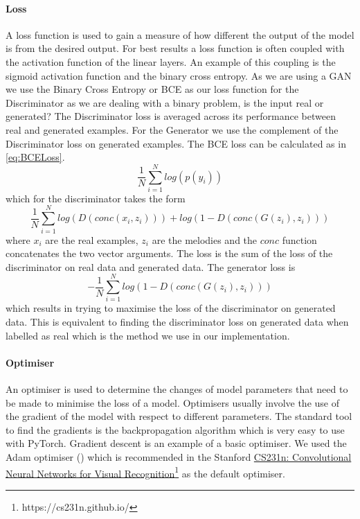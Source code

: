 \paragraph{Loss}
A loss function is used to gain a measure of how different the output of the model is from the desired output.
For best results a loss function is often coupled with the activation function of the linear layers.
An example of this coupling is the sigmoid activation function and the binary cross entropy. %
As we are using a GAN we use the Binary Cross Entropy or BCE as our loss function for the Discriminator as we are dealing with a binary problem, is the input real or generated?
The Discriminator loss is averaged across its performance between real and generated examples.
For the Generator we use the complement of the Discriminator loss on generated examples.
The BCE loss can be calculated as in \cref{eq:BCELoss}.
\begin{equation}
    \label{eq:BCELoss}
    \frac{1}{N} \sum_{i=1}^N log(p(y_i))
\end{equation}
    which for the discriminator takes the form
\begin{equation}
    \frac{1}{N} \sum_{i=1}^N log(D(conc(x_i,z_i))) + log(1-D(conc(G(z_i),z_i)))
\end{equation}
    where $x_i$ are the real examples, $z_i$ are the melodies and the $conc$ function concatenates the two vector arguments.
    The loss is the sum of the loss of the discriminator on real data and generated data.
    The generator loss is
\begin{equation}
    -\frac{1}{N} \sum_{i=1}^N log(1-D(conc(G(z_i),z_i)))
\end{equation}
    which results in trying to maximise the loss of the discriminator on generated data.
    This is equivalent to finding the discriminator loss on generated data when labelled as real which is the method we use in our implementation.

    
\paragraph{Optimiser}
An optimiser is used to determine the changes of model parameters that need to be made to minimise the loss of a model.
Optimisers usually involve the use of the gradient of the model with respect to different parameters.
The standard tool to find the gradients is the backpropagation algorithm 
which is very easy to use with PyTorch.
Gradient descent is an example of a basic optimiser.
We used the Adam optimiser (\cite{Adam}) which is recommended in the Stanford \href{https://cs231n.github.io/}{CS231n: Convolutional Neural Networks for Visual Recognition}\footnote{https://cs231n.github.io/} as the default optimiser.




